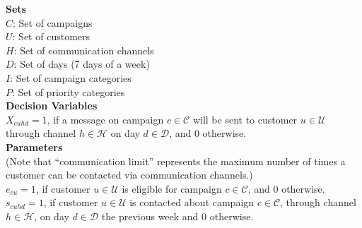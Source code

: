\documentclass[11pt]{article}
\begin{document}
\begin{singlespace}
\noindent \textbf{Sets}\\

\noindent ${C}$: Set of campaigns \\
\noindent ${U}$: Set of customers \\
\noindent ${H}$: Set of communication channels \\
\noindent ${D}$: Set of days (7 days of a week) \\
\noindent ${I}$: Set of campaign categories \\
\noindent ${P}$: Set of priority categories \\



\noindent \textbf{Decision Variables}\\

\noindent $X_{{c}{u}{h}{d}}=1$, if a message on campaign $c \in \mathcal{C}$ will be sent to customer $u \in \mathcal{U}$ through channel $h \in \mathcal{H}$ on day $d \in \mathcal{D}$, and 0 otherwise.\\

\noindent \textbf{Parameters}\\

\noindent (Note that ``communication limit'' represents the maximum number of times a customer can be contacted via communication channels.) \\

\noindent $e_{{c}{u}}=1$, if customer $u \in \mathcal{U}$ is eligible for campaign $c \in \mathcal{C}$, and 0 otherwise.\\

\noindent $s_{{c}{u}{h}{d}}=1$, if customer $u \in \mathcal{U}$ is contacted about campaign $c \in \mathcal{C}$, through channel $h \in \mathcal{H}$, on day $d \in \mathcal{D}$ the previous week and 0 otherwise.\\


\end{singlespace}
\end{document}
